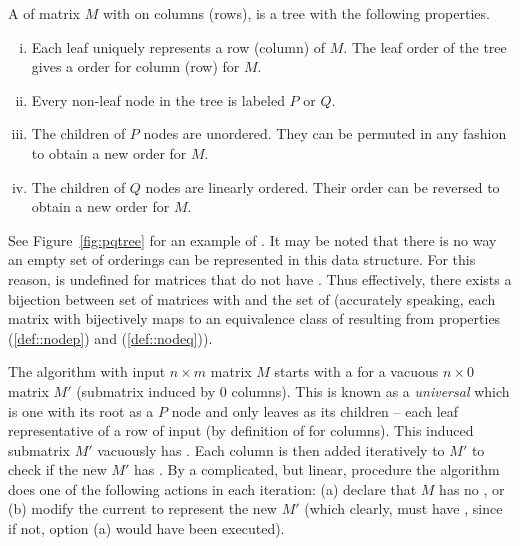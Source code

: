 \begin{definition}
  A \PQtree of matrix $M$ with \COP on columns (rows), is a tree with the following properties.
  \begin{enumerate}[i.]
    \singlespacing
  \item Each leaf uniquely represents a row (column) of $M$. The leaf
    order of the tree gives a \COP order for column (row) for $M$.
  \item Every non-leaf node in the tree is labeled $P$ or $Q$.
  \item \label{def::nodep} The children of $P$ nodes are
    unordered. They can be permuted in any fashion to obtain a new
    \COP order for $M$.
  \item \label{def::nodeq} The children of $Q$ nodes are linearly
    ordered. Their order can be reversed to obtain a new \COP
    order for $M$.
  \end{enumerate}
  \label{def:pqtree}
\end{definition}

See Figure~\ref{fig:pqtree} for an example of \PQtree. It may be noted
that there is no way an empty set of \COP orderings can be represented
in this data structure. For this reason, \PQtree is undefined for
matrices that do not have \COP.  Thus effectively, there exists a
bijection between set of matrices with \COP and the set of \PQtrees
(accurately speaking, each matrix with \COP bijectively maps to an
equivalence class of \PQtrees resulting from properties (\ref{def::nodep}) and
(\ref{def::nodeq})).


\figpqtree

The \cite{bl76} algorithm with input $n \times m$ matrix $M$ starts
with a \PQtree for a vacuous $n \times 0$ matrix $M'$ (submatrix
induced by 0 columns). This is known as a {\em universal} \PQtree
which is one with its root as a $P$ node and only leaves as its
children -- each leaf representative of a row of input (by definition
of \COP for columns). This induced submatrix $M'$ vacuously has \COP.
Each column is then added iteratively to $M'$ to check if the new $M'$
has \COP.  By a complicated, but linear, procedure the algorithm does
one of the following actions in each iteration: (a) declare that $M$
has no \COP, or (b) modify the current \PQtree to represent the new
$M'$ (which clearly, must have \COP, since if not, option (a) would
have been executed).


